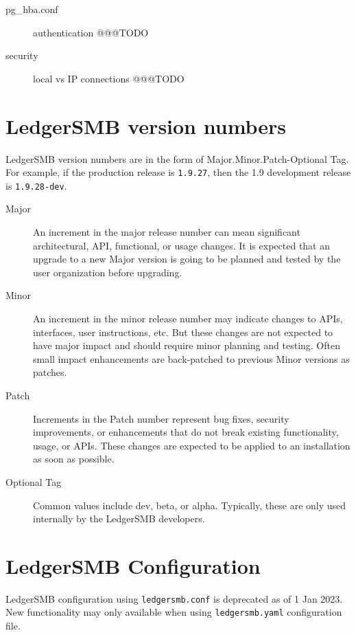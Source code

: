 \begin{description}
\item [pg\_hba.conf] authentication @@@TODO 
\item [security] local vs IP connections @@@TODO 
 
\end{description}


\section{LedgerSMB version numbers}
\label{sec-global-config-ledgersmb-version-numbers}

LedgerSMB version numbers  are in the form of Major.Minor.Patch-Optional Tag.
For example, if the production release is \texttt{1.9.27}, then the 1.9 development release is \texttt{1.9.28-dev}.

\begin{description}
\item [Major] An increment in the major release number can mean significant architectural, \gls{API}, functional, or usage changes. It is expected that an upgrade to a new Major version is  going to be planned and tested by the user organization before upgrading.
\item [Minor] An increment in the minor release number may indicate changes to \glspl{API}, interfaces, user instructions, etc.  But these changes are not expected to have major impact and should require minor planning and testing. Often small impact enhancements are back-patched to previous Minor versions as patches.
\item [Patch] Increments in the Patch number represent bug fixes, security improvements, or enhancements that do not break existing functionality, usage, or \glspl{API}.  These changes are expected to be applied to an installation as soon as possible.
\item [Optional Tag] Common values include dev, beta, or alpha. Typically, these are only used internally by the LedgerSMB developers.
\end{description}

\section{LedgerSMB Configuration}
\label{sec-global-config-ledgersmb}

LedgerSMB configuration using \texttt{ledgersmb.conf}  is deprecated as of 1 Jan 2023. New functionality may only available when using \texttt{ledgersmb.yaml}  configuration file.

